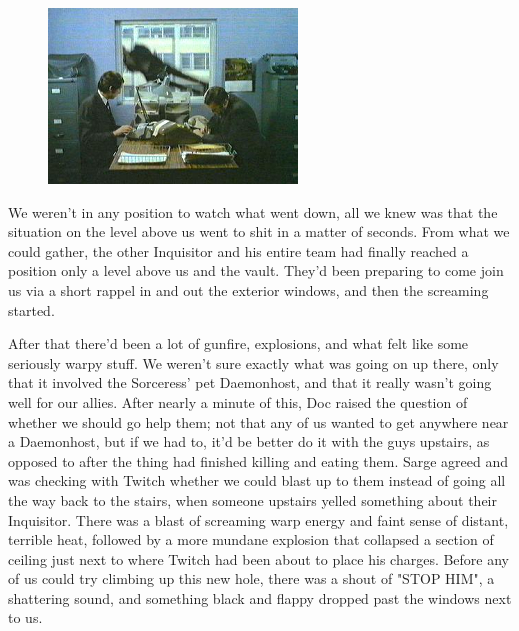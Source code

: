 \begin{figure}
	\begin{center}
		\includegraphics[width=\figwidth]{pics/18/66.png}
	\end{center}
\end{figure}
We weren't in any position to watch what went down, all we knew was that the situation on the level above us went to shit in a matter of seconds. 
From what we could gather, the other Inquisitor and his entire team had finally reached a position only a level above us and the vault. 
They'd been preparing to come join us via a short rappel in and out the exterior windows, and then the screaming started. 


After that there'd been a lot of gunfire, explosions, and what felt like some seriously warpy stuff. 
We weren't sure exactly what was going on up there, only that it involved the Sorceress' pet Daemonhost, and that it really wasn't going well for our allies. 
After nearly a minute of this, Doc raised the question of whether we should go help them; 
not that any of us wanted to get anywhere near a Daemonhost, but if we had to, it'd be better do it with the guys upstairs, as opposed to after the thing had finished killing and eating them. 
Sarge agreed and was checking with Twitch whether we could blast up to them instead of going all the way back to the stairs, when someone upstairs yelled something about their Inquisitor. 
There was a blast of screaming warp energy and faint sense of distant, terrible heat, followed by a more mundane explosion that collapsed a section of ceiling just next to where Twitch had been about to place his charges. 
Before any of us could try climbing up this new hole, there was a shout of "STOP HIM", a shattering sound, and something black and flappy dropped past the windows next to us.

